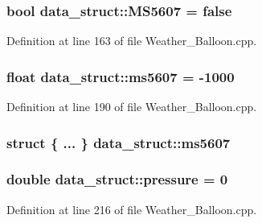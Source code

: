 \subsubsection[{\texorpdfstring{M\+S5607}{MS5607}}]{\setlength{\rightskip}{0pt plus 5cm}bool data\+\_\+struct\+::\+M\+S5607 = false}\hypertarget{structdata__struct_a5b810c790b9a5d830f15e36045a8d788}{}\label{structdata__struct_a5b810c790b9a5d830f15e36045a8d788}


Definition at line 163 of file Weather\+\_\+\+Balloon.\+cpp.

\subsubsection[{\texorpdfstring{ms5607}{ms5607}}]{\setlength{\rightskip}{0pt plus 5cm}float data\+\_\+struct\+::ms5607 = -\/1000}\hypertarget{structdata__struct_af1037aded922067ccf1f8317eb76a247}{}\label{structdata__struct_af1037aded922067ccf1f8317eb76a247}


Definition at line 190 of file Weather\+\_\+\+Balloon.\+cpp.

\subsubsection[{\texorpdfstring{ms5607}{ms5607}}]{\setlength{\rightskip}{0pt plus 5cm}struct \{ ... \}   data\+\_\+struct\+::ms5607}\hypertarget{structdata__struct_a66a25e7f8b144d70d91ad0a9f7703cb1}{}\label{structdata__struct_a66a25e7f8b144d70d91ad0a9f7703cb1}
\subsubsection[{\texorpdfstring{pressure}{pressure}}]{\setlength{\rightskip}{0pt plus 5cm}double data\+\_\+struct\+::pressure = 0}\hypertarget{structdata__struct_a5d0a52f39801cac8ea17a1a57421bee6}{}\label{structdata__struct_a5d0a52f39801cac8ea17a1a57421bee6}


Definition at line 216 of file Weather\+\_\+\+Balloon.\+cpp.

